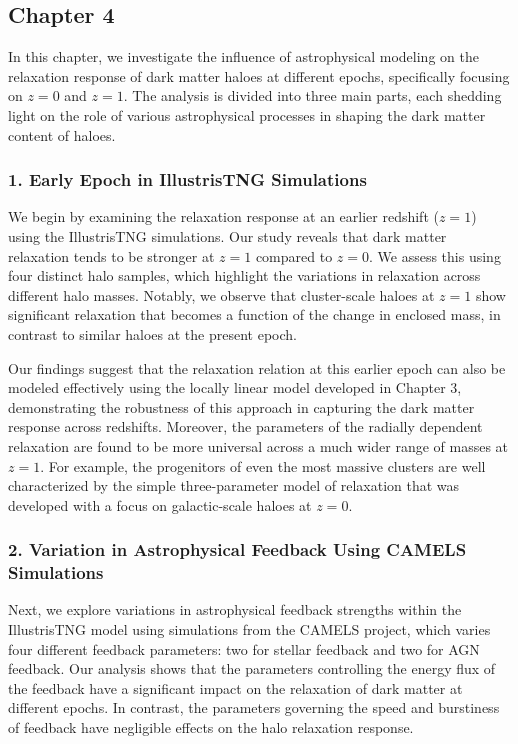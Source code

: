 \documentclass[a4paper, 12pt, oneside]{Thesis}  %
\begin{document}
\subsection*{Chapter 4}

In this chapter, we investigate the influence of astrophysical modeling on the relaxation response of dark matter haloes at different epochs, specifically focusing on \( z=0 \) and \( z=1 \). The analysis is divided into three main parts, each shedding light on the role of various astrophysical processes in shaping the dark matter content of haloes.

\subsubsection*{1. Early Epoch in IllustrisTNG Simulations}
We begin by examining the relaxation response at an earlier redshift (\( z=1 \)) using the IllustrisTNG simulations. Our study reveals that dark matter relaxation tends to be stronger at \( z=1 \) compared to \( z=0 \). We assess this using four distinct halo samples, which highlight the variations in relaxation across different halo masses. Notably, we observe that cluster-scale haloes at \( z=1 \) show significant relaxation that becomes a function of the change in enclosed mass, in contrast to similar haloes at the present epoch.

Our findings suggest that the relaxation relation at this earlier epoch can also be modeled effectively using the locally linear model developed in Chapter 3, demonstrating the robustness of this approach in capturing the dark matter response across redshifts. Moreover, the parameters of the radially dependent relaxation are found to be more universal across a much wider range of masses at \( z=1 \). For example, the progenitors of even the most massive clusters are well characterized by the simple three-parameter model of relaxation that was developed with a focus on galactic-scale haloes at \( z=0 \).

\subsubsection*{2. Variation in Astrophysical Feedback Using CAMELS Simulations}
Next, we explore variations in astrophysical feedback strengths within the IllustrisTNG model using simulations from the CAMELS project, which varies four different feedback parameters: two for stellar feedback and two for AGN feedback. Our analysis shows that the parameters controlling the energy flux of the feedback have a significant impact on the relaxation of dark matter at different epochs. In contrast, the parameters governing the speed and burstiness of feedback have negligible effects on the halo relaxation response.
\end{document}
